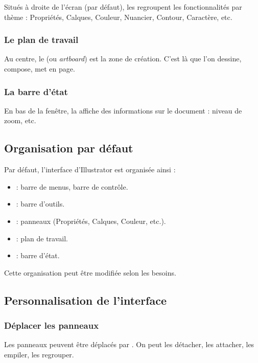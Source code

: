 Situés à droite de l'écran (par défaut), les  regroupent les fonctionnalités par thème : Propriétés, Calques, Couleur, Nuancier, Contour, Caractère, etc.

\subsubsection{Le plan de travail}

Au centre, le  (ou \emph{artboard}) est la zone de création. C'est là que l'on dessine, compose, met en page.

\subsubsection{La barre d'état}

En bas de la fenêtre, la  affiche des informations sur le document : niveau de zoom, etc.

\subsection{Organisation par défaut}

Par défaut, l'interface d'Illustrator est organisée ainsi :

\begin{itemize}
    \item {} : barre de menus, barre de contrôle.
    \item {} : barre d'outils.
    \item {} : panneaux (Propriétés, Calques, Couleur, etc.).
    \item {} : plan de travail.
    \item {} : barre d'état.
\end{itemize}

Cette organisation peut être modifiée selon les besoins.

\subsection{Personnalisation de l'interface}

\subsubsection{Déplacer les panneaux}

Les panneaux peuvent être déplacés par . On peut les détacher, les attacher, les empiler, les regrouper.

